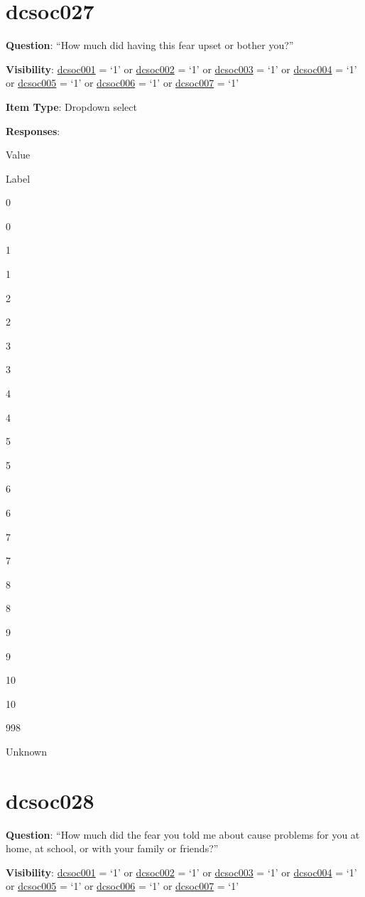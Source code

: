 \documentclass[]{book}
\begin{document}
\hypertarget{dcsoc027}{%
\section{dcsoc027}\label{dcsoc027}}

\textbf{Question}: ``How much did having this fear upset or bother you?''

\textbf{Visibility}: \protect\hyperlink{dcsoc001}{dcsoc001} = `1' or \protect\hyperlink{dcsoc002}{dcsoc002} = `1' or \protect\hyperlink{dcsoc003}{dcsoc003} = `1' or \protect\hyperlink{dcsoc004}{dcsoc004} = `1' or \protect\hyperlink{dcsoc005}{dcsoc005} = `1' or \protect\hyperlink{dcsoc006}{dcsoc006} = `1' or \protect\hyperlink{dcsoc007}{dcsoc007} = `1'

\textbf{Item Type}: Dropdown select

\textbf{Responses}:

Value

Label

0

0

1

1

2

2

3

3

4

4

5

5

6

6

7

7

8

8

9

9

10

10

998

Unknown

\hypertarget{dcsoc028}{%
\section{dcsoc028}\label{dcsoc028}}

\textbf{Question}: ``How much did the fear you told me about cause problems for you at home, at school, or with your family or friends?''

\textbf{Visibility}: \protect\hyperlink{dcsoc001}{dcsoc001} = `1' or \protect\hyperlink{dcsoc002}{dcsoc002} = `1' or \protect\hyperlink{dcsoc003}{dcsoc003} = `1' or \protect\hyperlink{dcsoc004}{dcsoc004} = `1' or \protect\hyperlink{dcsoc005}{dcsoc005} = `1' or \protect\hyperlink{dcsoc006}{dcsoc006} = `1' or \protect\hyperlink{dcsoc007}{dcsoc007} = `1'
\end{document}
